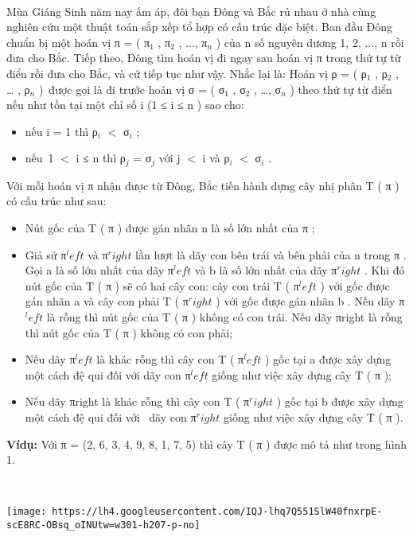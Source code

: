 

 

Mùa Giáng Sinh năm nay ấm áp, đôi bạn Đông và Bắc rủ nhau ở nhà cùng nghiên cứu một thuật toán sắp xếp tổ hợp có cấu trúc đặc biệt. Ban đầu Đông chuẩn bị một hoán vị π = ( π$_ 1 $ , π$_ 2 $ , ..., π$_ n $ ) của n số nguyên dương 1, 2, ..., n rồi đưa cho Bắc. Tiếp theo, Đông tìm hoán vị đi ngay sau hoán vị π trong thứ tự từ điển rồi đưa cho Bắc, và cứ tiếp tục như vậy. Nhắc lại là: Hoán vị ρ = ( ρ$_ 1 $ , ρ$_ 2 $ , … , ρ$_ n $ ) được gọi là đi trước hoán vị σ = ( σ$_ 1 $ , σ$_ 2 $ , …, σ$_ n $ ) theo thứ tự từ điển nếu như tồn tại một chỉ số i (1 ≤ i ≤ n ) sao cho:
\begin{itemize}
	\item nếu i = 1 thì ρ$_ i $ $<$ σ$_ i $ ;
	\item nếu 1 $<$ i ≤ n thì ρ$_ j $ = σ$_ j $ với j $<$ i và ρ$_ i $ $<$ σ$_ i $ .
\end{itemize}

Với mỗi hoán vị π nhận được từ Đông, Bắc tiến hành dựng cây nhị phân T ( π ) có cấu trúc như sau:
\begin{itemize}
	\item Nút gốc của T ( π ) được gán nhãn n là số lớn nhất của π ;
	\item Giả sử π$^ left $ và π$^ right $ lần lượt là dãy con bên trái và bên phải của n trong π . Gọi a là số lớn nhất của dãy π$^ left $ và b là số lớn nhất của dãy π$^ right $ . Khi đó nút gốc của T ( π ) sẽ có hai cây con: cây con trái T ( π$^ left $ ) với gốc được gán nhãn a và cây con phải T ( π$^ right $ ) với gốc được gán nhãn b . Nếu dãy π$^ left $ là rỗng thì nút gốc của T ( π ) không có con trái. Nếu dãy πright là rỗng thì nút gốc của T ( π ) không có con phải;
	\item Nếu dãy π$^ left $ là khác rỗng thì cây con T ( π$^ left $ ) gốc tại a được xây dựng một cách đệ qui đối với dãy con π$^ left $ giống như việc xây dựng cây T ( π );
	\item Nếu dãy πright là khác rỗng thì cây con T ( π$^ right $ ) gốc tại b được xây dựng một cách đệ qui đối với  dãy con π$^ right $ giống như việc xây dựng cây T ( π ).
\end{itemize}

\textbf{Ví}\textbf{dụ:} Với π = (2, 6, 3, 4, 9, 8, 1, 7, 5) thì cây T ( π ) được mô tả như trong hình 1.

 


\texttt{[image: https://lh4.googleusercontent.com/IQJ-lhq7Q551SlW40fnxrpE-scE8RC-OBsq\_oINUtw=w301-h207-p-no]}

